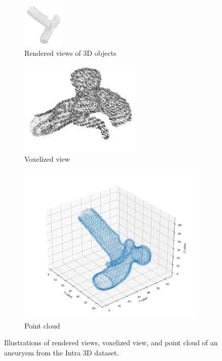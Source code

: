 \documentclass[%
 reprint,
 amsmath,amssymb,
 aps,
 floatfix,
 nofootinbib,
]{revtex4-2}
\begin{document}
\begin{figure}
\begin{subfigure}[b]{0.35\textwidth}
    \includegraphics[width=0.22\textwidth]{146.png}
    \caption{Rendered views of 3D objects}
  \end{subfigure}
  \hfill
  \begin{subfigure}[b]{0.3\textwidth}
    \includegraphics[width=\textwidth]{voxel.png}
    \caption{Voxelized view}
  \end{subfigure}
  \hfill
  \begin{subfigure}[b]{0.3\textwidth}
    \includegraphics[width=\textwidth]{point_cloud.png}
    \caption{Point cloud}
  \end{subfigure}

  \caption{Illustrations of rendered views, voxelized view, and point cloud of an aneurysm from the Intra 3D dataset.}
  \label{fig:combined_views}
\end{figure}
\end{document}
